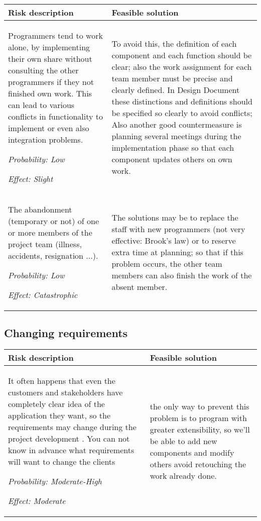 \documentclass{scrreprt}
\begin{document}
\begin{center}
\begin{tabularx}{\columnwidth}{XX}
\toprule \textbf{Risk description} & \textbf{Feasible solution}\\
\midrule
Programmers tend to work alone, by implementing their own share without consulting the other programmers if they not finished own work. This can lead to various conflicts in functionality to implement or even also integration problems. 

\emph{Probability: Low } 

\emph{Effect: Slight} & To avoid this, the definition of each component and each function should be clear; also the work assignment for each team member must be precise and clearly defined.
In Design Document these distinctions and definitions should be specified so clearly to avoid conflicts; Also another good countermeasure is planning several meetings during the implementation phase so that each component updates others on own work.\\
\midrule
The abandonment (temporary or not) of one or more members of the project team (illness, accidents, resignation ...).

\emph{Probability: Low } 

\emph{Effect: Catastrophic}& The solutions may be to replace the staff with new programmers (not very effective: Brook's law) or to reserve extra time at planning; so that if this problem occurs, the other team members can also finish the work of the absent member.\\

\bottomrule
\end{tabularx}
\end{center}

\subsection{Changing requirements}

\begin{center}
\begin{tabularx}{\columnwidth}{XX}
\toprule \textbf{Risk description} & \textbf{Feasible solution}\\
\midrule
 It often happens that even the customers and stakeholders have completely clear idea of the application they want, so the requirements may change during the project development . You can not know in advance what requirements will want to change the clients


\emph{Probability: Moderate-High } 

\emph{Effect: Moderate }& the only way to prevent this problem is to program with greater extensibility, so we’ll be able to add new components and modify others avoid retouching the work already done.\\
\bottomrule
\end{tabularx}
\end{center}
\end{document}
